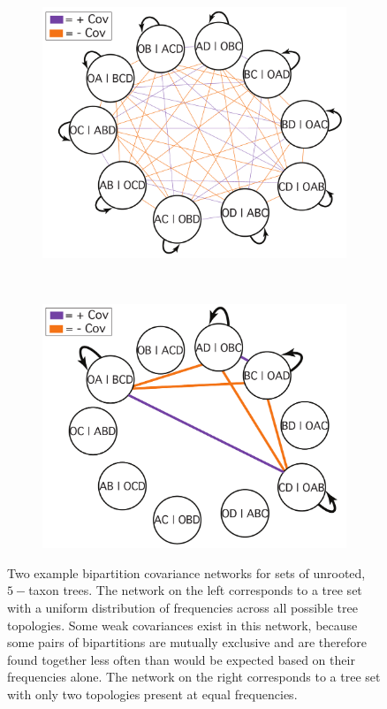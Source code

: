 \documentclass[11pt]{article}
\begin{document}
\begin{figure}[thbp!]\centering
\begin{subfigure}{0.4\textwidth}\centering
\includegraphics[scale=0.25]{imagesForManual/Figure3a.pdf}
\end{subfigure}
~ %
\begin{subfigure}{0.4\textwidth}\centering
\includegraphics[scale=0.25]{imagesForManual/Figure3b.pdf}
\end{subfigure}

\caption{Two example bipartition covariance networks for sets of unrooted, $5-$taxon trees. The network on the left corresponds to a tree set with a uniform distribution of frequencies across all possible tree topologies. Some weak covariances exist in this network, because some pairs of bipartitions are mutually exclusive and are therefore found together less often than would be expected based on their frequencies alone. The network on the right corresponds to a tree set with only two topologies present at equal frequencies.}\label{fig3}
\end{figure}
\end{document}
